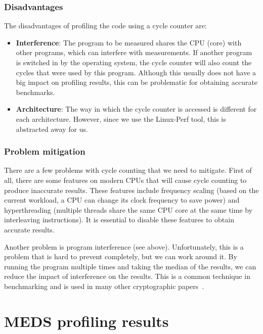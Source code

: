 \documentclass[11pt,a4paper]{report}
\theoremstyle{definition}
\begin{document}
\subsubsection{Disadvantages}
The disadvantages of profiling the code using a cycle counter are:
\begin{itemize}
  \item \textbf{Interference}: The program to be measured shares the CPU (core) with other programs, which can interfere with measurements. If another program is switched in by the operating system, the cycle counter will also count the cycles that were used by this program. Although this usually does not have a big impact on profiling results, this can be problematic for obtaining accurate benchmarks.
  \item \textbf{Architecture}: The way in which the cycle counter is accessed is different for each architecture. However, since we use the Linux-Perf tool, this is abstracted away for us.
\end{itemize}

\subsubsection{Problem mitigation}
There are a few problems with cycle counting that we need to mitigate. First of all, there are some features on modern CPUs that will cause cycle counting to produce inaccurate results. These features include frequency scaling (based on the current workload, a CPU can change its clock frequency to save power) and hyperthreading (multiple threads share the same CPU core at the same time by interleaving instructions). It is essential to disable these features to obtain accurate results.

\pagebreak

Another problem is program interference (see above). Unfortunately, this is a problem that is hard to prevent completely, but we can work around it. By running the program multiple times and taking the median of the results, we can reduce the impact of interference on the results. This is a common technique in benchmarking and is used in many other cryptographic papers~\cite{becker2021neon,ducas2018crystals}.

\section{MEDS profiling results}
\label{sec:medsprofilingresults}
\end{document}
